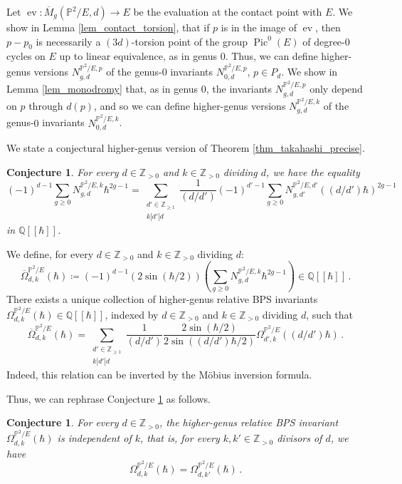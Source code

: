 \documentclass[11pt,letterpaper]{amsart}
\newtheorem{conj}[defn]{Conjecture}
\newcommand\PP{\mathbb P}
\newcommand\Q{\mathbb Q}
\newcommand\Z{\mathbb Z}
\newcommand\Pic{\operatorname{Pic}}
\newcommand\ev{\operatorname{ev}}
\begin{document}
Let $\ev \colon \overline{M}_g(\PP^2/E,d) \rightarrow E$ be the evaluation at the contact point with $E$. We show in Lemma \ref{lem_contact_torsion}, that if $p$ is in the image of $\ev$, then $p-p_0$ is necessarily a $(3d)$-torsion point of
the group
$\Pic^0(E)$ of degree-$0$ cycles on $E$ up to linear equivalence, as in genus $0$. Thus, we can define higher-genus versions $N_{g,d}^{\PP^2/E,p}$
of the genus-$0$ invariants $N_{0,d}^{\PP^2/E,p}$, $p\in P_d$.
We show in Lemma \ref{lem_monodromy} that, as in genus $0$, the invariants $N_{g,d}^{\PP^2/E,p}$ only depend on $p$ through $d(p)$, and so we can define higher-genus versions $N_{g,d}^{\PP^2/E,k}$ of the 
genus-$0$ invariants $N_{0,d}^{\PP^2/E,k}$.

We state a conjectural higher-genus version of Theorem \ref{thm_takahashi_precise}.

\begin{conj}\label{conj_takahashi_higher_genus_intro}
For every $d \in \Z_{>0}$ and $k \in \Z_{>0}$ dividing $d$,
we have the equality
\[ (-1)^{d-1}
\sum_{g \geqslant 0}N_{g,d}^{\PP^2/E,k}
\hbar^{2g-1} 
=\sum_{\substack{d'\in \Z_{\geqslant 1} 
\\k|d'|d}} \frac{1}{(d/d')}
(-1)^{d'-1}
\sum_{g \geqslant 0} N_{g,d'}^{\PP^2/E,d'}((d/d')\hbar)^{2g-1}\]
in $\Q[\![\hbar]\!]$.
\end{conj}


We define, for every 
$d \in \Z_{>0}$ and $k \in \Z_{>0}$
dividing $d$:
\[ \overline{\Omega}^{\PP^2/E}_{d,k}
(\hbar)
\coloneq (-1)^{d-1}\left(2 \sin (\hbar/2) \right)
\left( \sum_{g\geqslant 0} N_{g,d}^{\PP^2/E,k} \hbar^{2g-1} \right)\in \Q[\![\hbar]\!]\,.\]
There exists a unique collection of higher-genus relative BPS invariants
$\Omega_{d,k}^{\PP^2/E}(\hbar) \in \Q[\![\hbar]\!]$, indexed by $d\in \Z_{>0}$ and $k\in \Z_{>0}$ dividing $d$, such that
\[ \overline{\Omega}^{\PP^2/E}_{d,k}
(\hbar)
=\sum_{\substack{d'\in \Z_{\geqslant 1}
\\ k|d'|d}}
\frac{1}{(d/d')}\frac{2\sin(\hbar/2)}{
2\sin((d/d')\hbar/2)} 
\Omega^{\PP^2/E}_{d',k}((d/d')\hbar)\,.\]
Indeed, this relation can be inverted by the M\"obius inversion formula.

Thus, we can rephrase Conjecture \ref{conj_takahashi_higher_genus_intro} as
follows.

\begin{conj} \label{conj_tak_higher_genus_bps_intro}
For every $d \in \Z_{>0}$, the higher-genus relative BPS invariant
$\Omega_{d,k}^{\PP^2/E}(\hbar)$
is independent of $k$, 
that is, for every 
$k, k'\in \Z_{>0}$ divisors of $d$,
we have 
\[ \Omega_{d,k}^{\PP^2/E}(\hbar)
=\Omega_{d,k'}^{\PP^2/E}(\hbar)\,.\]
\end{conj}
\end{document}
